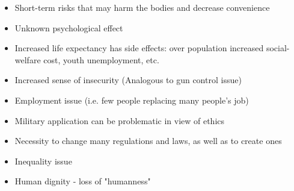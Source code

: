 \begin{itemize}
	\item Short-term risks that may harm the bodies and decrease convenience
	\item Unknown psychological effect
	\item Increased life expectancy has side effects: over population increased social-welfare cost, youth unemployment, etc.
	\item Increased sense of insecurity (Analogous to gun control issue)
	\item Employment issue (i.e. few people replacing many people's job)
	\item Military application can be problematic in view of ethics
	\item Necessity to change many regulations and laws, as well as to create ones
	\item Inequality issue
	\item Human dignity - loss of "humanness"
	
\end{itemize}